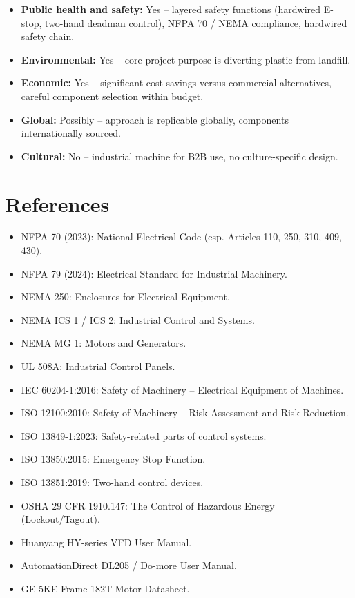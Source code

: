 \documentclass[hidelinks,12pt]{article}
\begin{document}
\begin{itemize}
    \item \textbf{Public health and safety:} Yes -- layered safety functions (hardwired E-stop, two-hand deadman control), NFPA 70 / NEMA compliance, hardwired safety chain.
    \item \textbf{Environmental:} Yes -- core project purpose is diverting plastic from landfill.
    \item \textbf{Economic:} Yes -- significant cost savings versus commercial alternatives, careful component selection within budget.
    \item \textbf{Global:} Possibly -- approach is replicable globally, components internationally sourced.
    \item \textbf{Cultural:} No -- industrial machine for B2B use, no culture-specific design.
\end{itemize}

\section{References}

\begin{itemize}
    \item NFPA 70 (2023): National Electrical Code (esp. Articles 110, 250, 310, 409, 430).
    \item NFPA 79 (2024): Electrical Standard for Industrial Machinery.
    \item NEMA 250: Enclosures for Electrical Equipment.
    \item NEMA ICS 1 / ICS 2: Industrial Control and Systems.
    \item NEMA MG 1: Motors and Generators.
    \item UL 508A: Industrial Control Panels.
    \item IEC 60204-1:2016: Safety of Machinery -- Electrical Equipment of Machines.
    \item ISO 12100:2010: Safety of Machinery -- Risk Assessment and Risk Reduction.
    \item ISO 13849-1:2023: Safety-related parts of control systems.
    \item ISO 13850:2015: Emergency Stop Function.
    \item ISO 13851:2019: Two-hand control devices.
    \item OSHA 29 CFR 1910.147: The Control of Hazardous Energy (Lockout/Tagout).
    \item Huanyang HY-series VFD User Manual.
    \item AutomationDirect DL205 / Do-more User Manual.
    \item GE 5KE Frame 182T Motor Datasheet.
\end{itemize}
\end{document}
